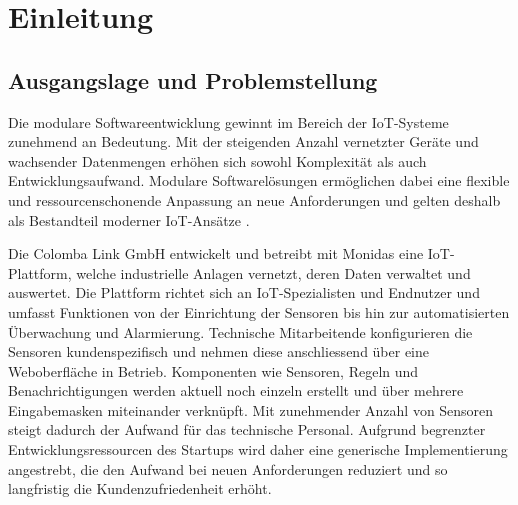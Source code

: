 \section{Einleitung}

\subsection{Ausgangslage und Problemstellung}
Die modulare Softwareentwicklung gewinnt im Bereich der IoT-Systeme zunehmend an Bedeutung. Mit der steigenden Anzahl vernetzter Geräte und wachsender Datenmengen erhöhen sich sowohl Komplexität als auch Entwicklungsaufwand. Modulare Softwarelösungen ermöglichen dabei eine flexible und ressourcenschonende Anpassung an neue Anforderungen und gelten deshalb als Bestandteil moderner IoT-Ansätze \cite{IoT}.


Die Colomba Link GmbH entwickelt und betreibt mit Monidas eine IoT-Plattform, welche industrielle Anlagen vernetzt, deren Daten verwaltet und auswertet. Die Plattform richtet sich an IoT-Spezialisten und Endnutzer und umfasst Funktionen von der Einrichtung der Sensoren bis hin zur automatisierten Überwachung und Alarmierung. Technische Mitarbeitende konfigurieren die Sensoren kundenspezifisch und nehmen diese anschliessend über eine Weboberfläche in Betrieb. Komponenten wie Sensoren, Regeln und Benachrichtigungen werden aktuell noch einzeln erstellt und über mehrere Eingabemasken miteinander verknüpft. Mit zunehmender Anzahl von Sensoren steigt dadurch der Aufwand für das technische Personal. Aufgrund begrenzter Entwicklungsressourcen des Startups wird daher eine generische Implementierung angestrebt, die den Aufwand bei neuen Anforderungen reduziert und so langfristig die Kundenzufriedenheit erhöht.


 
